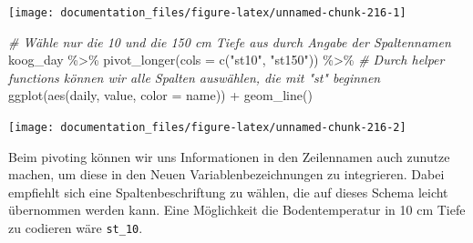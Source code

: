 \documentclass[
]{article}
\newenvironment{Shaded}{\begin{snugshade}}{\end{snugshade}}
\newcommand{\AttributeTok}[1]{\textcolor[rgb]{0.77,0.63,0.00}{#1}}
\newcommand{\CommentTok}[1]{\textcolor[rgb]{0.56,0.35,0.01}{\textit{#1}}}
\newcommand{\FunctionTok}[1]{\textcolor[rgb]{0.00,0.00,0.00}{#1}}
\newcommand{\NormalTok}[1]{#1}
\newcommand{\SpecialCharTok}[1]{\textcolor[rgb]{0.00,0.00,0.00}{#1}}
\newcommand{\StringTok}[1]{\textcolor[rgb]{0.31,0.60,0.02}{#1}}
\begin{document}
\begin{center}\texttt{[image: documentation\_files/figure-latex/unnamed-chunk-216-1]} \end{center}

\begin{Shaded}
\begin{Highlighting}[]
\CommentTok{\# Wähle nur die 10 und die 150 cm Tiefe aus durch Angabe der Spaltennamen}
\NormalTok{koog\_day }\SpecialCharTok{\%\textgreater{}\%}
  \FunctionTok{pivot\_longer}\NormalTok{(}\AttributeTok{cols =} \FunctionTok{c}\NormalTok{(}\StringTok{"st10"}\NormalTok{, }\StringTok{"st150"}\NormalTok{)) }\SpecialCharTok{\%\textgreater{}\%} \CommentTok{\# Durch helper functions können wir alle Spalten auswählen, die mit "st" beginnen}
  \FunctionTok{ggplot}\NormalTok{(}\FunctionTok{aes}\NormalTok{(daily, value, }\AttributeTok{color =}\NormalTok{ name)) }\SpecialCharTok{+}
  \FunctionTok{geom\_line}\NormalTok{()}
\end{Highlighting}
\end{Shaded}

\begin{center}\texttt{[image: documentation\_files/figure-latex/unnamed-chunk-216-2]} \end{center}

Beim pivoting können wir uns Informationen in den Zeilennamen auch zunutze machen, um diese in den Neuen Variablenbezeichnungen zu integrieren. Dabei empfiehlt sich eine Spaltenbeschriftung zu wählen, die auf dieses Schema leicht übernommen werden kann. Eine Möglichkeit die Bodentemperatur in 10 cm Tiefe zu codieren wäre \texttt{st\_10}.
\end{document}
